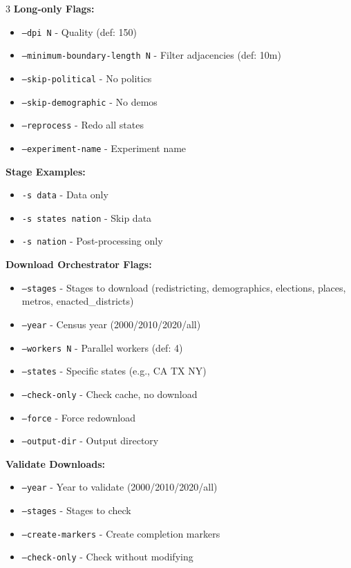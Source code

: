 \documentclass[10pt,landscape]{article}
\begin{document}
\begin{multicols}{3}
\textbf{Long-only Flags:}
\begin{itemize}\itemsep0pt
\item \texttt{--dpi N} - Quality (def: 150)
\item \texttt{--minimum-boundary-length N} - Filter adjacencies (def: 10m)
\item \texttt{--skip-political} - No politics
\item \texttt{--skip-demographic} - No demos
\item \texttt{--reprocess} - Redo all states
\item \texttt{--experiment-name} - Experiment name
\end{itemize}

\textbf{Stage Examples:}
\begin{itemize}\itemsep0pt
\item \texttt{-s data} - Data only
\item \texttt{-s states nation} - Skip data
\item \texttt{-s nation} - Post-processing only
\end{itemize}

\textbf{Download Orchestrator Flags:}
\begin{itemize}\itemsep0pt
\item \texttt{--stages} - Stages to download (redistricting, demographics, elections, places, metros, enacted\_districts)
\item \texttt{--year} - Census year (2000/2010/2020/all)
\item \texttt{--workers N} - Parallel workers (def: 4)
\item \texttt{--states} - Specific states (e.g., CA TX NY)
\item \texttt{--check-only} - Check cache, no download
\item \texttt{--force} - Force redownload
\item \texttt{--output-dir} - Output directory
\end{itemize}

\textbf{Validate Downloads:}
\begin{itemize}\itemsep0pt
\item \texttt{--year} - Year to validate (2000/2010/2020/all)
\item \texttt{--stages} - Stages to check
\item \texttt{--create-markers} - Create completion markers
\item \texttt{--check-only} - Check without modifying
\end{itemize}


\end{multicols}
\end{document}
